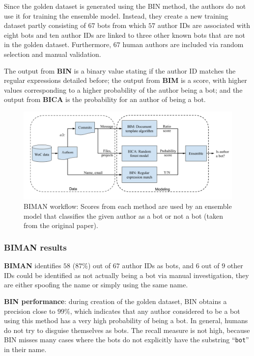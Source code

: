 \documentclass[a4paper, 12pt]{book}
\begin{document}
Since the golden dataset is generated using the BIN method, the authors do not use it for training the ensemble model. Instead, they create a new training dataset partly consisting of $67$ bots from which $57$ author IDs are associated with eight bots and ten author IDs are linked to three other known bots that are not in the golden dataset. Furthermore, $67$ human authors are included via random selection and manual validation. 

The output from \textbf{BIN} is a binary value stating if the author ID matches the regular expressions detailed before; the output from \textbf{BIM} is a score, with higher values corresponding to a higher probability of the author being a bot; and the output from \textbf{BICA} is the probability for an author of being a bot.

\begin{figure}
 \centering
  \includegraphics[width=15cm, keepaspectratio]{img/BIMAN-workflow.png}
  \caption{BIMAN workflow: Scores from each method are used by an ensemble model that classifies the given author as a bot or not a bot (taken from the original paper).}
  \label{fig:biman-workflow}
\end{figure}

\subsubsection{BIMAN results}
\label{sssec:dey-results-biman}

\textbf{BIMAN} identifies $58$ ($87\%$) out of $67$ author IDs as bots, and $6$ out of $9$ other IDs could be identified as not actually being a bot via manual investigation, they are either
spoofing the name or simply using the same name. 

\textbf{BIN performance}: during creation of the golden dataset, BIN obtains a precision close to $99\%$, which indicates that any author considered to be a bot using this method has a very high probability of being a bot. In general, humans do not try to disguise themselves as bots. The recall measure is not high, because BIN misses many cases where the bots do not explicitly have the substring ``\texttt{bot}'' in their name.
\end{document}
